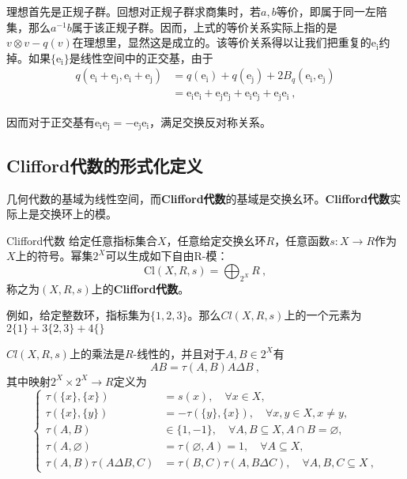 理想首先是正规子群。回想对正规子群求商集时，若$a,b$等价，即属于同一左陪集，那么$a^{-1}b$属于该正规子群。因而，上式的等价关系实际上指的是
$v \otimes v-q(v)$在理想里，显然这是成立的。该等价关系得以让我们把重复的$\mathrm {e_i}$约掉。如果$\{\mathrm{e_i}\}$是线性空间中的正交基，由于
\begin{equation}
\begin{aligned}
q(\mathrm{e_i+e_j,e_i+e_j})&=q(\mathrm{e_i})+q(\mathrm{e_j})+2 B_q(\mathrm{e_i,e_j})\\
&=\mathrm{e_ie_i+e_je_j+e_ie_j+e_je_i}~,
\end{aligned}
\end{equation}

因而对于正交基有$\mathrm{e_ie_j=-e_je_i}$，满足交换反对称关系。

\subsection{Clifford代数的形式化定义}
几何代数的基域为线性空间，而\textbf{Clifford代数}的基域是交换幺环。\textbf{Clifford代数}实际上是交换环上的模。
\begin{definition}{Clifford代数}
给定任意指标集合$X$，任意给定交换幺环$R$，任意函数$s:X\rightarrow {R}$作为$X$上的符号。幂集$2^X$可以生成如下自由R-模：
\begin{equation}
\mathrm{Cl}(X,R,s)=\bigoplus_{2^X}R~,
\end{equation}
称之为$(X,R,s)$上的\textbf{Clifford代数}。
\end{definition}

例如，给定整数环，指标集为$\{1,2,3\}$。那么$Cl(X,R,s)$上的一个元素为$2\{1\}+3\{2,3\}+4\{\}$


$Cl(X,R,s)$上的乘法是$R$-线性的，并且对于$A,B\in 2^X$有
\begin{equation}\label{eq_clf01_1}
AB=\tau(A,B)A\Delta B~,
\end{equation}
其中映射$2^X \times 2^X \rightarrow R$定义为
\begin{equation}
\left\{\begin{aligned}
\tau(\{x\},\{x\}) & =s(x), \quad \forall x \in X, \\
\tau(\{x\},\{y\}) & =-\tau(\{y\},\{x\}), \quad \forall x, y \in X, x \neq y, \\
\tau(A, B) & \in\{1,-1\}, \quad \forall A, B \subseteq X, A \cap B=\varnothing, \\
\tau(A, \varnothing) & =\tau(\varnothing, A)=1, \quad \forall A \subseteq X, \\
\tau(A, B) \tau(A \Delta B, C) & =\tau(B, C) \tau(A, B \Delta C), \quad \forall A, B, C \subseteq X~,
\end{aligned}\right.
\end{equation}


